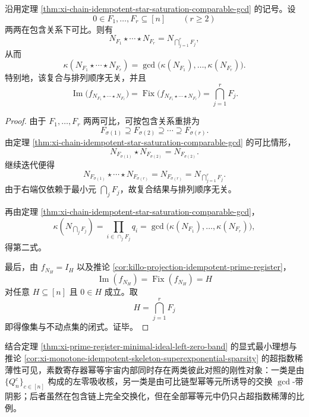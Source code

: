 \begin{corollary}[可比链式投影复合的一步交换化与像集闭式]\label{cor:xi-chain-idempotent-comparable-finite-gcd-collapse}
沿用定理 \ref{thm:xi-chain-idempotent-star-saturation-comparable-gcd} 的记号。设
\[
0\in F_1,\dots,F_r\subseteq[n]
\qquad (r\ge 2)
\]
两两在包含关系下可比。则有
\[
\boxed{\;
N_{F_1}\star\cdots\star N_{F_r}
=
N_{\bigcap_{j=1}^{r}F_j},\;}
\]
从而
\[
\boxed{\;
\kappa(N_{F_1}\star\cdots\star N_{F_r})
=
\gcd\bigl(\kappa(N_{F_1}),\dots,\kappa(N_{F_r})\bigr).\;}
\]
特别地，该复合与排列顺序无关，并且
\[
\boxed{\;
\operatorname{Im}\!\bigl(f_{N_{F_1}\star\cdots\star N_{F_r}}\bigr)
=
\operatorname{Fix}\!\bigl(f_{N_{F_1}\star\cdots\star N_{F_r}}\bigr)
=
\bigcap_{j=1}^{r}F_j.\;}
\]
\end{corollary}
\begin{proof}
由于 \(F_1,\dots,F_r\) 两两可比，可按包含关系重排为
\[
F_{\sigma(1)}\supseteq F_{\sigma(2)}\supseteq \cdots \supseteq F_{\sigma(r)}.
\]
由定理 \ref{thm:xi-chain-idempotent-star-saturation-comparable-gcd} 的可比情形，
\[
N_{F_{\sigma(1)}}\star N_{F_{\sigma(2)}}=N_{F_{\sigma(2)}}.
\]
继续迭代便得
\[
N_{F_{\sigma(1)}}\star\cdots\star N_{F_{\sigma(r)}}=N_{F_{\sigma(r)}}
=
N_{\bigcap_{j=1}^{r}F_j}.
\]
由于右端仅依赖于最小元 \(\bigcap_j F_j\)，故复合结果与排列顺序无关。

再由定理 \ref{thm:xi-chain-idempotent-star-saturation-comparable-gcd}，
\[
\kappa(N_{\bigcap_j F_j})
=
\prod_{i\in \cap_j F_j}q_i
=
\gcd\bigl(\kappa(N_{F_1}),\dots,\kappa(N_{F_r})\bigr),
\]
得第二式。

最后，由 \(f_{N_H}=I_H\) 以及推论 \ref{cor:killo-projection-idempotent-prime-register}，
\[
\operatorname{Im}(f_{N_H})=\operatorname{Fix}(f_{N_H})=H
\]
对任意 \(H\subseteq[n]\) 且 \(0\in H\) 成立。取
\[
H=\bigcap_{j=1}^{r}F_j
\]
即得像集与不动点集的闭式。证毕。
\end{proof}

\noindent 结合定理 \ref{thm:xi-prime-register-minimal-ideal-left-zero-band} 的显式最小理想与推论 \ref{cor:xi-monotone-idempotent-skeleton-superexponential-sparsity} 的超指数稀薄性可见，素数寄存器幂等宇宙内部同时存在两类彼此对照的刚性对象：一类是由 \(\{Q_n^c\}_{c\in[n]}\) 构成的左零吸收核，另一类是由可比链型幂等元所诱导的交换 \(\gcd\)-带阴影；后者虽然在包含链上完全交换化，但在全部幂等元中仍只占超指数稀薄的比例。

\endinput
